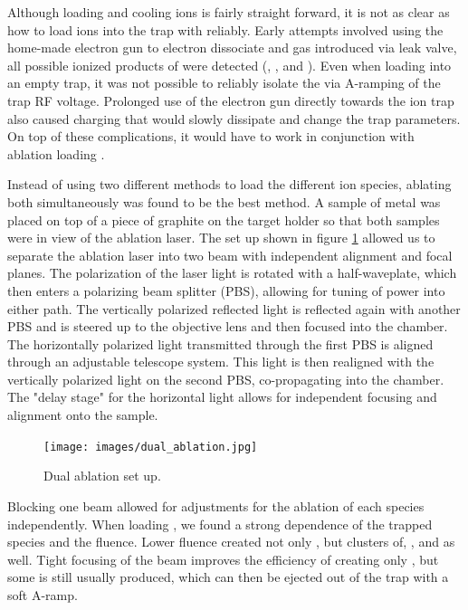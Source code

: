 Although loading and cooling  ions is fairly straight forward, it is not as clear as how to load  ions into the trap with  reliably. Early attempts involved using the home-made electron gun to electron dissociate and  gas introduced via leak valve, all possible ionized products of  were detected (, , and ). Even when loading into an empty trap, it was not possible to reliably isolate the  via A-ramping of the trap RF voltage. Prolonged use of the electron gun directly towards the ion trap also caused charging that would slowly dissipate and change the trap parameters. On top of these complications, it would have to work in conjunction with ablation loading .

Instead of using two different methods to load the different ion species, ablating both simultaneously was found to be the best method. A sample of  metal was placed on top of a piece of graphite on the target holder so that both samples were in view of the ablation laser. The set up shown in figure \ref{fig: dual ablation} allowed us to separate the ablation laser into two beam with independent alignment and focal planes. The polarization of the laser light is rotated with a half-waveplate, which then enters a polarizing beam splitter (PBS), allowing for tuning of power into either path. The vertically polarized reflected light is reflected again with another PBS and is steered up to the objective lens and then focused into the chamber. The horizontally polarized light transmitted through the first PBS is aligned through an adjustable telescope system. This light is then realigned with the vertically polarized light on the second PBS, co-propagating into the chamber. The "delay stage" for the horizontal light allows for independent focusing and alignment onto the sample.

\begin{figure}[H]
	\centering
	\texttt{[image: images/dual\_ablation.jpg]}
	\caption{Dual ablation set up.}
	\label{fig: dual ablation}
\end{figure}

Blocking one beam allowed for adjustments for the ablation of each species independently. When loading , we found a strong dependence of the trapped species and the fluence. Lower fluence created not only , but clusters of, , and  as well. Tight focusing of the beam improves the efficiency of creating only , but some  is still usually produced, which can then be ejected out of the trap with a soft A-ramp.

